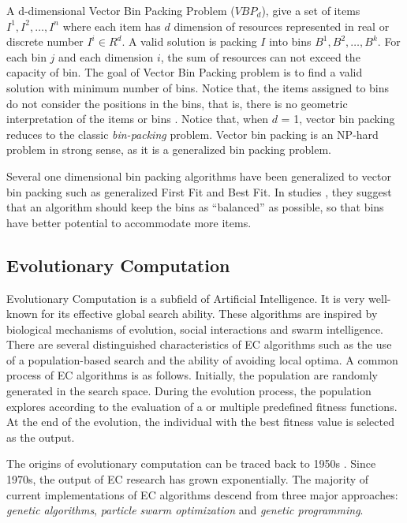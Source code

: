 A d-dimensional Vector Bin Packing Problem ($VBP_d$), give a set of items $I^1, I^2, \dots, I^n$ where each item has $d$ dimension of resources represented in real or discrete number $I^i \in R^d$. A valid solution is packing $I$ into bins $B^1, B^2, \dots, B^k$. For each bin $j$ and each dimension $i$, the sum of resources can not exceed the capacity of bin. The goal of Vector Bin Packing problem is to find a valid solution with minimum number of bins. Notice that, the items assigned to bins do not consider the positions in the bins, that is, there is no geometric interpretation of the items or bins \cite{Johnson:2016wp}.  Notice that, when $d$ = 1, vector bin packing reduces to the classic \emph{bin-packing} problem. Vector bin packing is an NP-hard problem in strong sense, as it is a generalized bin packing problem.

Several one dimensional bin packing algorithms have been generalized to vector bin packing such as generalized First Fit and Best Fit. In studies \cite{}, they suggest that an algorithm should keep the bins as ``balanced'' as possible, so that bins have better potential to accommodate more items. 

\subsection{Evolutionary Computation}
Evolutionary Computation is a subfield of Artificial Intelligence. It is very well-known for its effective global search ability. These algorithms are 
inspired by biological mechanisms of evolution, social interactions and swarm intelligence. 
There are several distinguished characteristics of EC algorithms such
as the use of a population-based search and the ability of avoiding local optima. 
A common process of EC algorithms is as follows. Initially, the population are randomly generated in the search space. During the evolution process, the population
explores according to the evaluation of a or multiple predefined fitness functions. At the end of the evolution, the individual with the best fitness value is selected as the output.

The origins of evolutionary computation can be traced back to 1950s \cite{Back:1997gb}. Since 1970s, the output of EC research has grown exponentially. 
The majority of current implementations of EC algorithms descend from three major approaches: \emph{genetic algorithms}, \emph{particle swarm optimization}
and \emph{genetic programming}.

